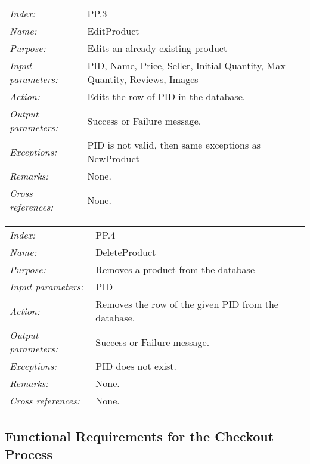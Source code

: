 \documentclass[10pt,letter]{article}
\begin{document}
\begin{tabularx}{\textwidth}{l X}
    \it{Index:} & PP.3 \\
    \it{Name:} & EditProduct \\
    \it{Purpose:} & Edits an already existing product\\
    \it{Input parameters:} & PID, Name, Price, Seller, Initial Quantity, Max Quantity, Reviews, Images\\
    \it{Action:} & Edits the row of PID in the database.\\
    \it{Output parameters:} & Success or Failure message. \\
    \it{Exceptions:} & PID is not valid, then same exceptions as NewProduct \\
    \it{Remarks:} & None. \\
    \it{Cross references:} & None. \\
    \hline
\end{tabularx}

\begin{tabularx}{\textwidth}{l X}
    \it{Index:} & PP.4 \\
    \it{Name:} & DeleteProduct \\
    \it{Purpose:} & Removes a product from the database\\
    \it{Input parameters:} & PID\\
    \it{Action:} & Removes the row of the given PID from the database.\\
    \it{Output parameters:} & Success or Failure message. \\
    \it{Exceptions:} & PID does not exist. \\
    \it{Remarks:} & None. \\
    \it{Cross references:} & None. \\
    \hline
\end{tabularx}

\subsection{Functional Requirements for the Checkout Process}
\end{document}

